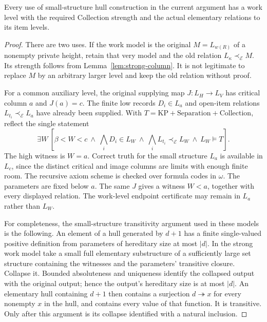 \begin{lemma}\label{lem:work}
Every use of small-structure hull construction in the current
argument has a work level with the required Collection strength
and the actual elementary relations to its item levels.
\end{lemma}
\begin{proof}
There are two uses. If the work model is the original
$M=L_{w(R)}$ of a nonempty private height, retain that very model and
the old relation $L_\kappa\prec_{\mathcal E}M$. Its strength follows
from Lemma~\ref{lem:strong-column}. It is not legitimate to replace
$M$ by an arbitrary larger level and keep the old relation without
proof.

For a common auxiliary level, the original supplying map
$J:L_H\to L_V$ has critical column $a$ and $J(a)=c$. The finite low
records $D_i\in L_a$ and open-item relations
$L_{t_i}\prec_{\mathcal E}L_a$ have already been supplied. With
$T=\mathrm{KP}+\mathrm{Separation}+\mathrm{Collection}$, reflect the
single statement
\begin{equation}\label{eq:5-2}
 \exists W\ [\beta<W<c\ \wedge\ \bigwedge_i D_i\in L_W
 \ \wedge\ \bigwedge_i L_{t_i}\prec_{\mathcal E}L_W
 \ \wedge\ L_W\models T].                               
\end{equation}
The high witness is $W=a$. Correct truth for the small structure
$L_a$ is available in $L_c$, since the distinct critical and image
columns are limits with enough finite room. The recursive axiom
scheme is checked over formula codes in $\omega$. The parameters
are fixed below $a$. The same $J$ gives a witness $W<a$, together
with every displayed relation. The work-level endpoint certificate
may remain in $L_a$ rather than $L_W$. 

For completeness, the small-structure transitivity argument used in
these models is the following. An element of a hull generated by
$d+1$ has a finite single-valued positive definition from parameters
of hereditary size at most $|d|$. In the strong work model take a
small full elementary substructure of a sufficiently large set
structure containing the witnesses and the parameters' transitive
closure. Collapse it. Bounded absoluteness and uniqueness identify
the collapsed output with the original output; hence the output's
hereditary size is at most $|d|$. An elementary hull containing
$d+1$ then contains a surjection $d\twoheadrightarrow x$ for every
nonempty $x$ in the hull, and contains every value of that function.
It is transitive. Only after this argument is its collapse identified
with a natural inclusion. 
\end{proof}

